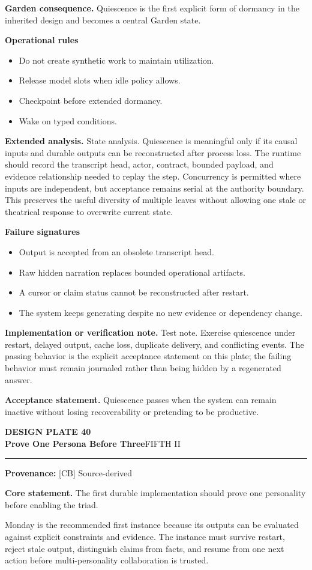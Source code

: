 \documentclass[10pt,letterpaper,oneside]{article}
\newcommand{\prov}[1]{\textcolor{gardenBlue}{\sffamily\footnotesize\textbf{Provenance:} #1}}
\newcommand{\platetitle}[3]{%
  \begin{minipage}[t][0.54in][t]{\textwidth}
  {\sffamily\bfseries\color{gardenDeep}\fontsize{9}{10}\selectfont DESIGN PLATE #1}\\[-1pt]
  {\sffamily\bfseries\color{gardenInk}\fontsize{16.5}{18}\selectfont #2}\hfill{\sffamily\color{gardenGreen}\large #3}
  \end{minipage}\vspace{-2pt}\hrule\vspace{5pt}}
\begin{document}
\textbf{Garden consequence.} Quiescence is the first explicit form of dormancy in the inherited design and becomes a central Garden state.

\textbf{Operational rules}
\begin{itemize}
\item Do not create synthetic work to maintain utilization.
\item Release model slots when idle policy allows.
\item Checkpoint before extended dormancy.
\item Wake on typed conditions.
\end{itemize}
\textbf{Extended analysis.} State analysis. Quiescence is meaningful only if its causal inputs and durable outputs can be reconstructed after process loss. The runtime should record the transcript head, actor, contract, bounded payload, and evidence relationship needed to replay the step. Concurrency is permitted where inputs are independent, but acceptance remains serial at the authority boundary. This preserves the useful diversity of multiple leaves without allowing one stale or theatrical response to overwrite current state.

\textbf{Failure signatures}
\begin{itemize}
\item Output is accepted from an obsolete transcript head.
\item Raw hidden narration replaces bounded operational artifacts.
\item A cursor or claim status cannot be reconstructed after restart.
\item The system keeps generating despite no new evidence or dependency change.
\end{itemize}
\textbf{Implementation or verification note.} Test note. Exercise quiescence under restart, delayed output, cache loss, duplicate delivery, and conflicting events. The passing behavior is the explicit acceptance statement on this plate; the failing behavior must remain journaled rather than being hidden by a regenerated answer.

\begin{acceptbox}
\textbf{Acceptance statement.} Quiescence passes when the system can remain inactive without losing recoverability or pretending to be productive.
\end{acceptbox}
\newpage
\platetitle{40}{Prove One Persona Before Three}{FIFTH II}
\prov{[CB] Source-derived}
\fontsize{8.85}{10.45}\selectfont
\begin{corebox}
\textbf{Core statement.} The first durable implementation should prove one personality before enabling the triad.
\end{corebox}
Monday is the recommended first instance because its outputs can be evaluated against explicit constraints and evidence. The instance must survive restart, reject stale output, distinguish claims from facts, and resume from one next action before multi-personality collaboration is trusted.
\end{document}
